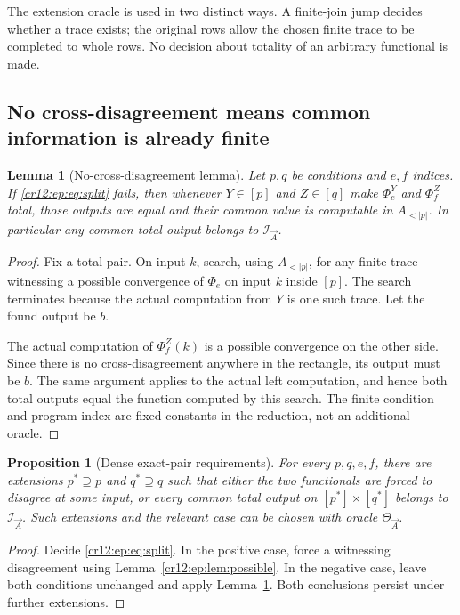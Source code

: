 \documentclass[11pt,letterpaper]{article}
\theoremstyle{plain}
\newtheorem{lemma}[theorem]{Lemma}
\newtheorem{proposition}[theorem]{Proposition}
\theoremstyle{definition}
\theoremstyle{remark}
\numberwithin{equation}{section}
\newcommand{\I}{\mathcal I}
\newcommand{\Alt}[1]{A_{<#1}}            %
\begin{document}
The extension oracle is used in two distinct ways. A finite-join jump decides
whether a trace exists; the original rows allow the chosen finite trace to be
completed to whole rows. No decision about totality of an arbitrary functional is
made.

\subsection{No cross-disagreement means common information is already finite}
\begin{lemma}[No-cross-disagreement lemma]\label{cr12:ep:lem:no-cross}
Let $p,q$ be conditions and $e,f$ indices. If \eqref{cr12:ep:eq:split} fails, then
whenever $Y\in[p]$ and $Z\in[q]$ make $\Phi_e^Y$ and $\Phi_f^Z$ total, those outputs
are equal and their common value is computable in $\Alt{|p|}$. In particular any
common total output belongs to $\I_{\vec A}$.
\end{lemma}
\begin{proof}
Fix a total pair. On input $k$, search, using $\Alt{|p|}$, for any finite trace
witnessing a possible convergence of $\Phi_e$ on input $k$ inside $[p]$. The search
terminates because the actual computation from $Y$ is one such trace. Let the found
output be $b$.

The actual computation of $\Phi_f^Z(k)$ is a possible convergence on the other side.
Since there is no cross-disagreement anywhere in the rectangle, its output must be
$b$. The same argument applies to the actual left computation, and hence both total
outputs equal the function computed by this search. The finite condition and
program index are fixed constants in the reduction, not an additional oracle.
\end{proof}

\begin{proposition}[Dense exact-pair requirements]\label{cr12:ep:prop:dense}
For every $p,q,e,f$, there are extensions $p^*\supseteq p$ and $q^*\supseteq q$ such
that either the two functionals are forced to disagree at some input, or every
common total output on $[p^*]\times[q^*]$ belongs to $\I_{\vec A}$. Such extensions
and the relevant case can be chosen with oracle $\Theta_{\vec A}$.
\end{proposition}
\begin{proof}
Decide \eqref{cr12:ep:eq:split}. In the positive case, force a witnessing disagreement
using Lemma~\ref{cr12:ep:lem:possible}. In the negative case, leave both conditions
unchanged and apply Lemma~\ref{cr12:ep:lem:no-cross}. Both conclusions persist under
further extensions.
\end{proof}
\end{document}
